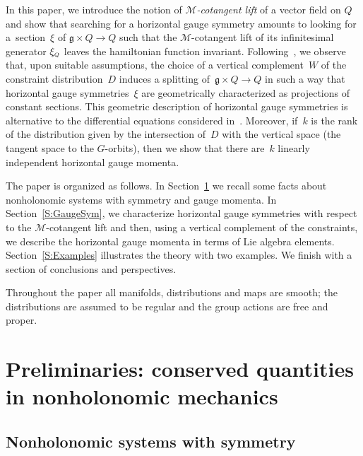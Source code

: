 \documentclass[pdftex]{sigma}
\numberwithin{equation}{section}
\def\M{\mathcal{M}}
\def\g{\mathfrak{g}}
\def\subQQ{{\mbox{\tiny{$Q$}}}}
\begin{document}
In this paper, we introduce the notion of {\it $\M$-cotangent lift} of a vector f\/ield
on $Q$ and show that searching for a horizontal gauge symmetry amounts to
looking for a~section~$\xi$ of $\g\times Q \to Q$  such that the $\M$-cotangent
lift of its inf\/initesimal generator $\xi_\subQQ$ leaves the hamiltonian function invariant.
Following~\cite{Paula}, we observe  that, upon suitable assumptions,  the choice
of a vertical complement~$W$ of the constraint distribution~$D$ induces
a splitting of~$\g\times Q \to Q$ in such a way that horizontal gauge symmetries~$\xi$ are geometrically characterized as projections of constant sections.
This geometric description of  horizontal gauge symmetries is alternative
to the dif\/ferential equations considered in~\cite{BGMConservation, FSG2008}.
Moreover, if~$k$ is the rank of the distribution given by the intersection of~$D$ with the vertical space (the tangent space to the $G$-orbits), then
we show that there are~$k$ linearly independent horizontal gauge momenta.

The paper is organized as follows. In Section~\ref{S:Preliminaries} we recall
some facts about nonholonomic systems with symmetry and gauge momenta.
In Section~\ref{S:GaugeSym}, we characterize horizontal gauge symmetries
with respect to the $\M$-cotangent lift and then, using a vertical complement
of the constraints, we describe the horizontal gauge momenta in terms of Lie
algebra elements. Section~\ref{S:Examples} illustrates the theory with two
examples. We f\/inish with a section of conclusions and perspectives.

Throughout the paper all manifolds, distributions and maps are smooth; the distributions
are assumed to be regular and the group actions are free and proper.

\section[Preliminaries: conserved quantities in nonholonomic mechanics]{Preliminaries: conserved quantities\\ in nonholonomic mechanics} \label{S:Preliminaries}

\subsection{Nonholonomic systems with symmetry}\label{Ss:NH}
\end{document}
